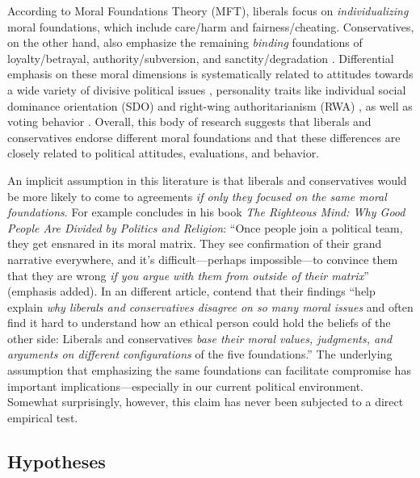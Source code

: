 According to Moral Foundations Theory (MFT), liberals focus on \emph{individualizing} moral foundations, which include care/harm and fairness/cheating. Conservatives, on the other hand, also emphasize the remaining \emph{binding} foundations of loyalty/betrayal, authority/subversion, and sanctity/degradation \citep{haidt2007morality, graham2009liberals}. Differential emphasis on these moral dimensions is systematically related to attitudes towards a wide variety of divisive political issues \citep[e.g.][]{koleva2012tracing, kertzer2014moral, low2015moral}, personality traits like individual social dominance orientation (SDO) and right-wing authoritarianism (RWA) \citep{federico2013mapping}, as well as voting behavior \citep{franks2015using}. Overall, this body of research suggests that liberals and conservatives endorse different moral foundations and that these differences are closely related to political attitudes, evaluations, and behavior.

An implicit assumption in this literature is that liberals and conservatives would be more likely to come to agreements \emph{if only they focused on the same moral foundations}. For example \citet[365]{haidt2012righteous} concludes in his book \emph{The Righteous Mind: Why Good People Are Divided by Politics and Religion}: ``Once people join a political team, they get ensnared in its moral matrix. They see confirmation of their grand
narrative everywhere, and it's difficult---perhaps impossible---to convince them that they are wrong \emph{if you argue with them from outside of their matrix}'' (emphasis added). In an different article, \citet[1040]{graham2009liberals} contend that their findings ``help explain \emph{why liberals and conservatives disagree on so many moral issues} and often find it hard to understand how an ethical person could hold the beliefs of the other side: Liberals and conservatives \emph{base their moral values, judgments, and arguments on different configurations} of the five foundations.'' The underlying assumption that emphasizing the same foundations can facilitate compromise has important implications---especially in our current political environment. Somewhat surprisingly, however, this claim has never been subjected to a direct empirical test.

\subsection{Hypotheses}

